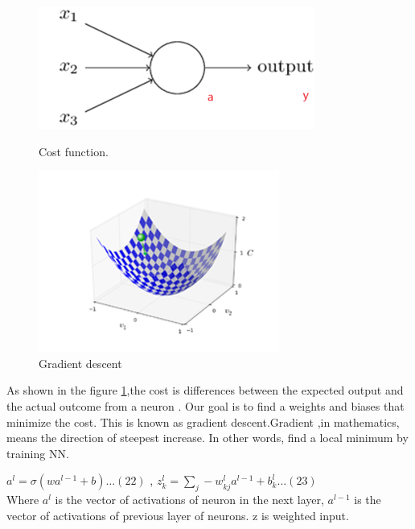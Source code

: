 \documentclass{article}
\begin{document}
\begin{figure}[H]
  \centering
  \begin{minipage}[b]{0.4\textwidth}
    \includegraphics[width=\textwidth]{img/gradient1.png}
    \caption{Cost function.}
    \label{cost}
  \end{minipage}
  \hfill
  \begin{minipage}[b]{0.5\textwidth}
    \includegraphics[width=\textwidth]{img/gradient2.png}
    \caption{Gradient descent}
  \end{minipage}
\end{figure}
As shown in the figure \ref{cost},the cost is differences between the expected output and the actual outcome from a neuron . Our goal is to find a weights and biases that minimize the cost. This is known as gradient descent.Gradient ,in mathematics, means the direction of steepest increase. In other words, find a local minimum by training NN.

$a^l =\sigma{(wa^{l-1}+b)} \dots (22)$ ,
$z^l_k =\sum_{j}-w^l_{kj}a^{l-1}+b^l_k \dots  (23) $\\
Where $a^l$ is the vector of activations of neuron in the next layer, $a^{l-1}$ is the vector of activations of previous layer of neurons. z is weighted input.
\end{document}

